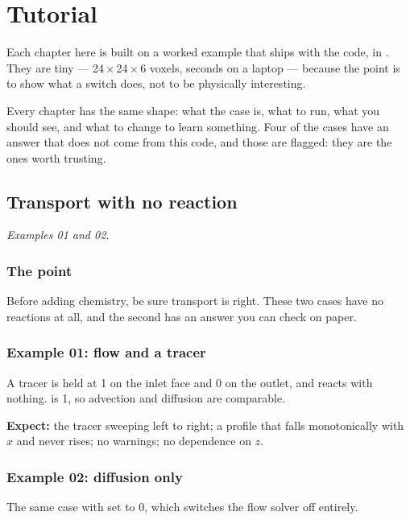 \part{Tutorial}

Each chapter here is built on a worked example that ships with the code, in
. They are tiny --- 24\,$\times$\,24\,$\times$\,6 voxels,
seconds on a laptop --- because the point is to show what a switch does, not to
be physically interesting.

Every chapter has the same shape: what the case is, what to run, what you
should see, and what to change to learn something. Four of the cases have an
answer that does not come from this code, and those are flagged: they are the
ones worth trusting.

\chapter{Transport with no reaction}
\label{ch:transport}

\emph{Examples 01 and 02.}

\section{The point}

Before adding chemistry, be sure transport is right. These two cases have no
reactions at all, and the second has an answer you can check on paper.

\section{Example 01: flow and a tracer}

A tracer is held at 1 on the inlet face and 0 on the outlet, and reacts with
nothing.  is 1, so advection and diffusion are comparable.

\textbf{Expect:} the tracer sweeping left to right; a profile that falls
monotonically with $x$ and never rises; no \code{[NEG!]} warnings; no
dependence on $z$.

\section{Example 02: diffusion only}

The same case with  set to 0, which switches the flow solver off
entirely.

